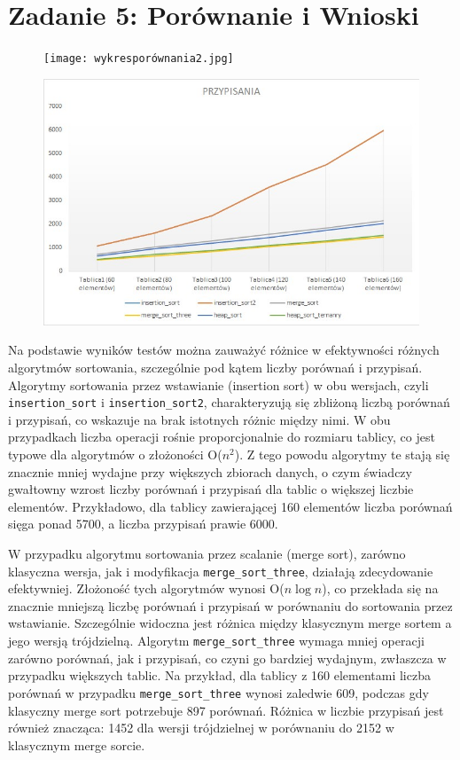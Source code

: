 \documentclass{article}
\theoremstyle{definition}
\begin{document}
\section{Zadanie 5: Porównanie i Wnioski}
\begin{figure}[h]	
	\texttt{[image: wykresporównania2.jpg]} 
	\label{fig:wykres porównania}
\end{figure}	

\begin{figure}[h]	
	\centering
	\includegraphics[width=1.0\textwidth]{wykresprzypisania2.jpg} 
	\label{fig:wykres2}
\end{figure}	




Na podstawie wyników testów można zauważyć różnice w efektywności różnych algorytmów sortowania, szczególnie pod kątem liczby porównań i przypisań. Algorytmy sortowania przez wstawianie (insertion sort) w obu wersjach, czyli \texttt{insertion\_sort} i \texttt{insertion\_sort2}, charakteryzują się zbliżoną liczbą porównań i przypisań, co wskazuje na brak istotnych różnic między nimi. W obu przypadkach liczba operacji rośnie proporcjonalnie do rozmiaru tablicy, co jest typowe dla algorytmów o złożoności O($n^2$). Z tego powodu algorytmy te stają się znacznie mniej wydajne przy większych zbiorach danych, o czym świadczy gwałtowny wzrost liczby porównań i przypisań dla tablic o większej liczbie elementów. Przykładowo, dla tablicy zawierającej 160 elementów liczba porównań sięga ponad 5700, a liczba przypisań prawie 6000.

W przypadku algorytmu sortowania przez scalanie (merge sort), zarówno klasyczna wersja, jak i modyfikacja \texttt{merge\_sort\_three}, działają zdecydowanie efektywniej. Złożoność tych algorytmów wynosi O($n \log n$), co przekłada się na znacznie mniejszą liczbę porównań i przypisań w porównaniu do sortowania przez wstawianie. Szczególnie widoczna jest różnica między klasycznym merge sortem a jego wersją trójdzielną. Algorytm \texttt{merge\_sort\_three} wymaga mniej operacji zarówno porównań, jak i przypisań, co czyni go bardziej wydajnym, zwłaszcza w przypadku większych tablic. Na przykład, dla tablicy z 160 elementami liczba porównań w przypadku \texttt{merge\_sort\_three} wynosi zaledwie 609, podczas gdy klasyczny merge sort potrzebuje 897 porównań. Różnica w liczbie przypisań jest również znacząca: 1452 dla wersji trójdzielnej w porównaniu do 2152 w klasycznym merge sorcie.
\end{document}
